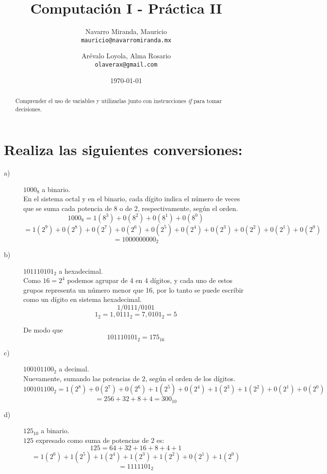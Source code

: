 \documentclass[a4paper]{article}
\title{Computación I - Práctica II}
\author{
  Navarro Miranda, Mauricio\\
  \texttt{mauricio@navarromiranda.mx}
  \and
  Arévalo Loyola, Alma Rosario\\
  \texttt{olaverax@gmail.com}
}
\date{\today}
\begin{document}
\maketitle

\begin{abstract}
Comprender el uso de variables y utilizarlas junto con instrucciones \textit{if} para tomar decisiones.
\end{abstract}

\section{Realiza las siguientes conversiones:}
   
\begin{description}
  \item[a)] $1000_8$ a binario. \\
  
		En el sistema octal y en el binario, cada dígito indica el número de veces que se suma cada potencia de 8 o de 2, respectivamente, según el orden. 
        $$1000_8 = 1(8^3) + 0(8^2) + 0(8^1) + 0(8^0)$$
        $$= 1(2^9)+0(2^8) +0(2^7) +0(2^6)+ 0(2^5)+ 0(2^4)+0(2^3) + 0(2^2)+0(2^1) +0(2^0)$$
        $$= 1000000000_2$$
  \item[b)] $101110101_2$ a hexadecimal. \\
  
  Como $16=2^4$ podemos agrupar de 4 en 4 dígitos, y cada uno de estos grupos representa un número menor que 16, por lo tanto se puede escribir como un dígito en sistema hexadecimal.
  $$1/0111/0101$$
  $$1_2 =1, 0111_2=7, 0101_2=5$$
  
  De modo que $$101110101_2=175_{16}$$
  
  
  
  \item[c)] $100101100_2$ a decimal. \\
   
   Nuevamente, sumando las potencias de $2$, según el orden de los dígitos. $$100101100_2=1(2^8)+0(2^7)+0(2^6)+1(2^5)+0(2^4)+1(2^3)+1(2^2)+0(2^1)+0(2^0)$$    
$$= 256+32+8+4=300_{10}$$


\item[d)] $125_{10}$ a binario. \\
$125$ expresado como suma de potencias de $2$ es: $$125=64+32+16+8+4+1$$
$$=1(2^6)+1(2^5)+1(2^4)+1(2^3)+1(2^2)+0(2^1)+1(2^0)$$
$$=1111101_2$$
    
    




\end{description}
\end{document}
